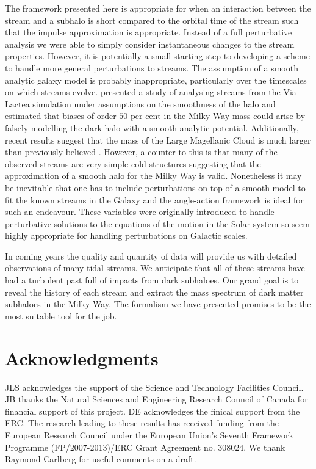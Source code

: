 \documentclass[useAMS,usenatbib,fleqn,a4paper]{mn2e}
\def\percent{\text{ per cent}}
\def\percent{\text{ per cent}}
\begin{document}
The framework presented here is appropriate for when an interaction between the stream and a subhalo is short compared to the orbital time of the stream such that the impulse approximation is appropriate. Instead of a full perturbative analysis we were able to simply consider instantaneous changes to the stream properties. However, it is potentially a small starting step to developing a scheme to handle more general perturbations to streams. The assumption of a smooth analytic galaxy model is probably inappropriate, particularly over the timescales on which streams evolve. \cite{Bonaca2014} presented a study of analysing streams from the Via Lactea simulation under assumptions on the smoothness of the halo and estimated that biases of order $50\percent$ in the Milky Way mass could arise by falsely modelling the dark halo with a smooth analytic potential. Additionally, recent results suggest that the mass of the Large Magellanic Cloud is much larger than previously believed \citep{Kallivayalil2013, Penarrubia2015}. However, a counter to this is that many of the observed streams are very simple cold structures suggesting that the approximation of a smooth halo for the Milky Way is valid. Nonetheless it may be inevitable that one has to include perturbations on top of a smooth model to fit the known streams in the Galaxy and the angle-action framework is ideal for such an endeavour. These variables were originally introduced to handle perturbative solutions to the equations of the motion in the Solar system so seem highly appropriate for handling perturbations on Galactic scales.

In coming years the quality and quantity of data will provide us with detailed observations of many tidal streams. We anticipate that all of these streams have had a turbulent past full of impacts from dark subhaloes. Our grand goal is to reveal the history of each stream and extract the mass spectrum of dark matter subhaloes in the Milky Way. The formalism we have presented promises to be the most suitable tool for the job.

\section*{Acknowledgments}
JLS acknowledges the support of the Science and Technology Facilities
Council. JB thanks the Natural Sciences and Engineering Research
Council of Canada for financial support of this project. DE acknowledges the finical support from the ERC. The research leading to these
results has received funding from the European Research Council under
the European Union's Seventh Framework Programme (FP/2007-2013)/ERC
Grant Agreement no. 308024. We thank Raymond Carlberg for useful comments on a draft.
\end{document}
